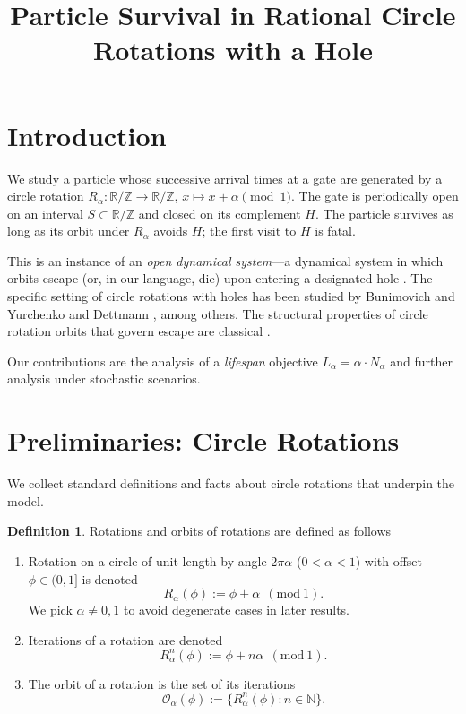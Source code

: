 \documentclass{article}
\title{Particle Survival in Rational Circle Rotations with a Hole}
\author{}
\date{}
\theoremstyle{definition}
\newtheorem{definition}{Definition}[section]
\newcommand{\safeSet}{ S }
\newcommand{\holeSet}{ H }
\newcommand{\travelTime}{ \alpha }
\newcommand{\phase}{ \phi }
\newcommand{\modx}{ \text{mod} \ }
\newcommand{\fatalIndex}[1]{N_#1}
\newcommand{\lifespan}[1]{ L_#1 }
\newcommand{\orbit}[2]{ \mathcal{O}_#1(#2) }
\newcommand{\rotation}[3]{ R_#1^#2(#3) }
\begin{document}
\maketitle

\section{Introduction}

We study a particle whose successive arrival times at a gate are generated by a circle rotation $R_\alpha: \mathbb{R}/\mathbb{Z} \to \mathbb{R}/\mathbb{Z}$, $x \mapsto x + \alpha \pmod{1}$. The gate is periodically open on an interval $\safeSet\subset\mathbb{R}/\mathbb{Z}$ and closed on its complement $\holeSet$. The particle survives as long as its orbit under $R_\alpha$ avoids $\holeSet$; the first visit to $\holeSet$ is fatal.

This is an instance of an \textit{open dynamical system}---a dynamical system in which orbits escape (or, in our language, die) upon entering a designated hole \cite{PianigianYorke79, DemersYoung06}. The specific setting of circle rotations with holes has been studied by Bunimovich and Yurchenko \cite{BunimovichYurchenko11} and Dettmann \cite{Dettmann12}, among others. The structural properties of circle rotation orbits that govern escape are classical \cite{KatokHasselblatt95}.

Our contributions are the analysis of a \textit{lifespan} objective $\lifespan{\travelTime} = \travelTime \cdot \fatalIndex{\travelTime}$ and further analysis under stochastic scenarios.

\section{Preliminaries: Circle Rotations}

We collect standard definitions and facts about circle rotations that underpin the model.

\begin{definition}
\label{def:rotation}
Rotations and orbits of rotations are defined as follows
\begin{enumerate}
\item Rotation on a circle of unit length by angle $2\pi\travelTime$ ($0<\alpha<1$) with offset $\phase \in (0,1]$ is denoted
\[
R_\travelTime(\phase):=\phase+\travelTime \ \ (\modx 1).
\]
We pick $\alpha\neq0,1$ to avoid degenerate cases in later results.
\item Iterations of a rotation are denoted
\[
R^n_\travelTime(\phase):=\phase+n\travelTime \ \ (\modx 1).
\]
\item The orbit of a rotation is the set of its iterations
\[
\orbit{\travelTime}{\phase}:=\{\rotation{\travelTime}{n}{\phase} : n\in\mathbb{N}\}.
\]
\end{enumerate}
    
\end{definition}
\end{document}
